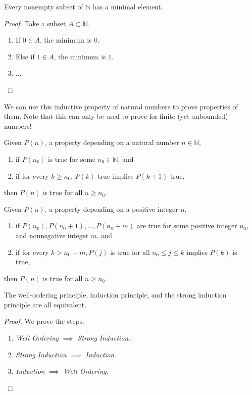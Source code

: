   \begin{lemma}
    Every nonempty subset of $\mathbb{N}$ has a minimal element. 
  \end{lemma} 
  \begin{proof}
    Take a subset $A \subset \mathbb{N}$. 
    \begin{enumerate}
      \item If $0 \in A$, the minimum is $0$. 
      \item Else if $1 \in A$, the minimum is $1$. 
      \item ...
    \end{enumerate} 
  \end{proof}

  We can use this inductive property of natural numbers to prove properties of them. Note that this can only be used to prove for finite (yet unbounded) numbers! 

  \begin{lemma}
    Given $P(n)$, a property depending on a natural number $n \in \mathbb{N}$, 
    \begin{enumerate}
      \item if $P(n_0)$ is true for some $n_0 \in \mathbb{N}$, and
      \item if for every $k \geq n_0$, $P(k)$ true implies $P(k+1)$ true, 
    \end{enumerate}
    then $P(n)$ is true for all $n \geq n_0$. 
  \end{lemma}

  \begin{lemma}
    Given $P(n)$, a property depending on a positive integer $n$, 
    \begin{enumerate}
      \item if $P(n_0), P(n_0 + 1), \ldots, P(n_0 + m)$ are true for some positive integer $n_0$, and nonnegative integer $m$, and 
      \item if for every $k > n_0 + m, P(j)$ is true for all $n_0 \leq j \leq k$ implies $P(k)$ is true, 
    \end{enumerate}
    then $P(n)$ is true for all $n \geq n_0$. 
  \end{lemma} 

  \begin{theorem}
    The well-ordering principle, induction principle, and the strong induction principle are all equivalent. 
  \end{theorem}
  \begin{proof}
    We prove the steps. 
    \begin{enumerate}
      \item \textit{Well Ordering $\implies$ Strong Induction}. 
      \item \textit{Strong Induction $\implies$ Induction}.  
      \item \textit{Induction $\implies$ Well-Ordering}. 
    \end{enumerate}
  \end{proof}

